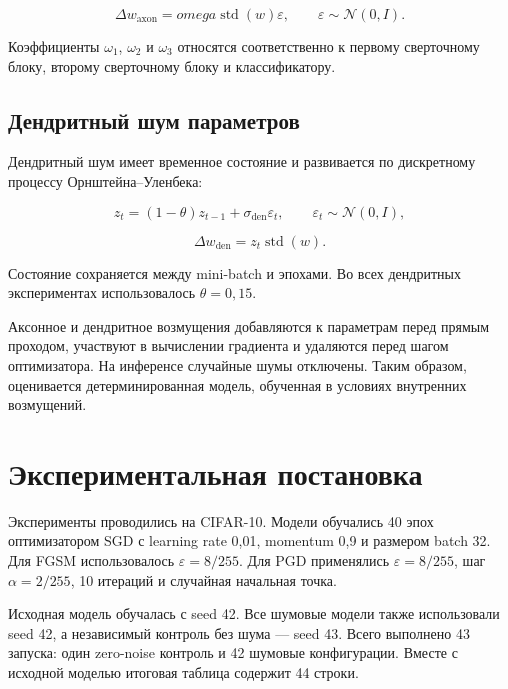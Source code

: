 \documentclass[a4paper]{article}
\begin{document}
\begin{equation}
\Delta w_{\mathrm{axon}}=omega\operatorname{std}(w)\varepsilon,
\qquad \varepsilon\sim\mathcal{N}(0,I).
\end{equation}

Коэффициенты $\omega_1$, $\omega_2$ и $\omega_3$ относятся соответственно к первому сверточному блоку, второму сверточному блоку и классификатору.

\subsection{Дендритный шум параметров}

Дендритный шум имеет временное состояние и развивается по дискретному процессу Орнштейна--Уленбека:

\begin{equation}
z_t=(1-\theta)z_{t-1}+\sigma_{\mathrm{den}}\varepsilon_t,
\qquad \varepsilon_t\sim\mathcal{N}(0,I),
\end{equation}

\begin{equation}
\Delta w_{\mathrm{den}}=z_t\operatorname{std}(w).
\end{equation}

Состояние сохраняется между mini-batch и эпохами. Во всех дендритных экспериментах использовалось $\theta=0{,}15$.

Аксонное и дендритное возмущения добавляются к параметрам перед прямым проходом, участвуют в вычислении градиента и удаляются перед шагом оптимизатора. На инференсе случайные шумы отключены. Таким образом, оценивается детерминированная модель, обученная в условиях внутренних возмущений.

\section{Экспериментальная постановка}

Эксперименты проводились на CIFAR-10. Модели обучались 40 эпох оптимизатором SGD с learning rate 0{,}01, momentum 0{,}9 и размером batch 32. Для FGSM использовалось $\varepsilon=8/255$. Для PGD применялись $\varepsilon=8/255$, шаг $\alpha=2/255$, 10 итераций и случайная начальная точка.

Исходная модель обучалась с seed 42. Все шумовые модели также использовали seed 42, а независимый контроль без шума --- seed 43. Всего выполнено 43 запуска: один zero-noise контроль и 42 шумовые конфигурации. Вместе с исходной моделью итоговая таблица содержит 44 строки.
\end{document}
